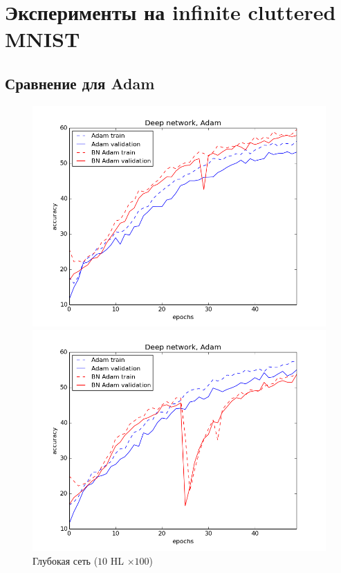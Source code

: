 \documentclass[12pt,oneside]{article}
\begin{document}
\section{Эксперименты на infinite cluttered MNIST}

\subsection{Сравнение для Adam}

\begin{figure}[h!]
\centering
\begin{minipage}{0.45\textwidth}
\includegraphics[scale=0.45]{images/clDeep_adam.png}
\end{minipage} \hfill
\begin{minipage}{0.45\textwidth}
\includegraphics[scale=0.45]{images/clDeep_adam2.png}
\end{minipage}
\caption{\small Глубокая сеть ($10$ HL $\times 100$)}
\end{figure}
\end{document}
